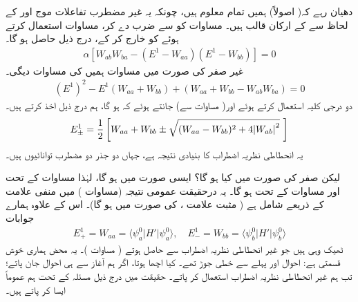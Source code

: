 دھیان رہے کہ( اصولاً) ہمیں تمام  معلوم ہیں، چونکہ یہ غیر مضطرب تفاعلات موج  اور  کے لحاظ سے  کے ارکان قالب ہیں۔ مساوات  کو  سے ضرب دے کر، مساوات  استعمال کرتے ہوئے  کو خارج کر کے، درج ذیل حاصل ہو گا۔
\begin{align}\label{مساوات_غیر_مضطرب_پہلا_اچھا_نتیجہ}
\alpha [W_{ab} W_{ba} - (E^1 - W_{aa}) (E^1 - W_{bb})] = 0
\end{align}
غیر صفر  کی صورت میں مساوات  ہمیں  کی مساوات دیگی۔ 
\begin{align}\label{مساوات_غیر_مضطرب_امتیازی_مساوات}
(E^1)^2 - E^1 (W_{aa} + W_{bb}) + (W_{aa} + W_{bb} - W_{ab} W_{ba}) = 0
\end{align}
دو درجی کلیہ استعمال کرتے ہوئے اور( مساوات  سے) جانتے ہوئے کہ  ہو گا، ہم درج ذیل اخذ کرتے ہیں۔
\begin{align}\label{مساوات_غیر_مضطرب_مضطرب_تونائیاں}
E_{\pm}^1 = \frac{1}{2} \left[W_{aa} + W_{bb} \pm \sqrt{(W_{aa} - W_{bb})^2 + 4 \abs{W_{ab}}^2} \,\,\right ]
\end{align}
یہ انحطاطی نظریہ اضطراب کا بنیادی نتیجہ ہے، جہاں دو جذر دو مضطرب توانائیوں ہیں۔

 لیکن صفر  کی صورت میں کیا ہو گا؟ ایسی صورت میں  ہو گا، لہٰذا مساوات  کے تحت  اور مساوات  کے تحت  ہو گا۔ یہ درحقیقت عمومی نتیجہ (مساوات ) میں منفی علامت کے ذریعے شامل ہے ( مثبت علامت ،  کی صورت میں ہو گا)۔ اس کے علاوہ ہمارے جوابات 
\begin{align*}
E_{+}^1 = W_{aa} = \langle \psi_a^0 | H' | \psi_a^0 \rangle, \quad E_{-}^1 = W_{bb} = \langle \psi_b^0 | H' | \psi_b^0 \rangle
\end{align*}
ٹھیک وہی ہیں جو غیر انحطاطی نظریہ اضطراب سے حاصل ہوتے ( مساوات )۔ یہ محض ہماری خوش قسمتی ہے: احوال  اور  پہلے سے  خطی جوڑ تھے۔ کیا اچھا ہوتا، اگر ہم آغاز سے ہی  احوال جان پاتے؛ تب ہم غیر انحطاطی نظریہ اضطراب استعمال کر پاتے۔ حقیقت میں درج ذیل مسئلہ کے تحت ہم عموماً ایسا کر پاتے ہیں۔

